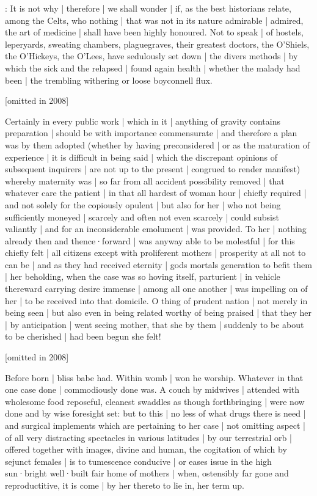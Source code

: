 
:
It is not why |
therefore |
we shall wonder |
if,
as the best historians relate,
among the Celts,
who nothing |
that was not in its nature admirable |
admired,
the art of medicine |
shall have been highly honoured.
Not to speak |
of hostels,
leperyards,
sweating chambers,
plaguegraves,
their greatest doctors,
the O'Shiels,
the O'Hickeys,
the O'Lees,
have sedulously set down |
the divers methods |
by which the sick and the relapsed |
found again health |
whether the malady had been |
the trembling withering or loose boyconnell flux.

[omitted in 2008]

Certainly in every public work |
which in it |
anything of gravity contains preparation |
should be with importance commensurate |
and therefore a plan was by them adopted
(whether by having preconsidered |
or as the maturation of experience |
it is difficult in being said |
which the discrepant opinions of subsequent inquirers |
are not up to the present |
congrued to render manifest)
whereby maternity was |
so far from all accident possibility removed |
that whatever care the patient |
in that all hardest of woman hour |
chiefly required |
and not solely for the copiously opulent |
but also for her |
who not being sufficiently moneyed |
scarcely and often not even scarcely |
could subsist valiantly |
and for an inconsiderable emolument |
was provided.
To her |
nothing already then and thence·forward |
was anyway able to be molestful |
for this chiefly felt |
all citizens except with proliferent mothers |
prosperity at all not to can be |
and as they had received eternity |
gods mortals generation to befit them |
her beholding,
when the case was so hoving itself,
parturient |
in vehicle thereward carrying desire immense |
among all one another |
was impelling on of her |
to be received into that domicile.
O thing of prudent nation |
not merely in being seen |
but also even in being related worthy of being praised |
that they her |
by anticipation |
went seeing mother,
that she by them |
suddenly to be about to be cherished |
had been begun she felt!



[omitted in 2008]

Before born |
bliss babe had.
Within womb |
won he worship.
Whatever in that one case done |
commodiously done was.
A couch by midwives |
attended with wholesome food reposeful,
cleanest swaddles as though forthbringing |
were now done and by wise foresight set:
but to this |
no less of what drugs there is need |
and surgical implements which are pertaining to her case |
not omitting aspect |
of all very distracting spectacles in various latitudes |
by our terrestrial orb |
offered together with images,
divine and human,
the cogitation of which by sejunct females |
is to tumescence conducive |
or eases issue in the high sun·bright well·built fair home of mothers |
when,
ostensibly far gone and reproductitive,
it is come |
by her thereto to lie in,
her term up.

